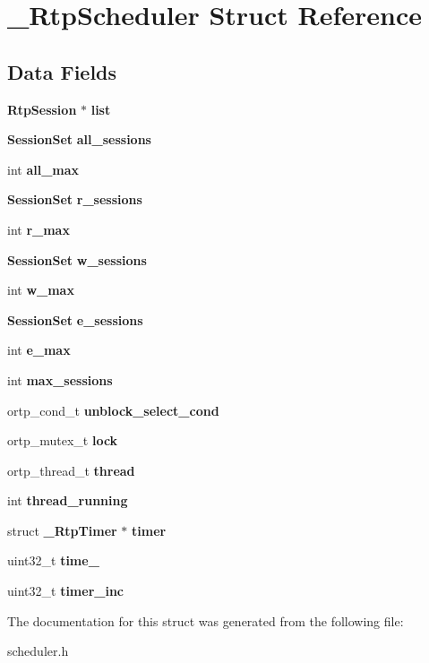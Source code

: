\section{\+\_\+\+Rtp\+Scheduler Struct Reference}
\label{struct__RtpScheduler}
\subsection*{Data Fields}
\begin{DoxyCompactItemize}
\item 
\mbox{\label{struct__RtpScheduler_a00008d3e3c83553fd3379068b9a0969d}} 
\textbf{ Rtp\+Session} $\ast$ {\bfseries list}
\item 
\mbox{\label{struct__RtpScheduler_aebda68a3931ef9bb18dae5c384a8412c}} 
\textbf{ Session\+Set} {\bfseries all\+\_\+sessions}
\item 
\mbox{\label{struct__RtpScheduler_ac52c29bf3a02bdf14af171b31432e23f}} 
int {\bfseries all\+\_\+max}
\item 
\mbox{\label{struct__RtpScheduler_a7faa9121b5e9bad92f507d0916943ec1}} 
\textbf{ Session\+Set} {\bfseries r\+\_\+sessions}
\item 
\mbox{\label{struct__RtpScheduler_a4350a88b7da8885624a7571c1f045a85}} 
int {\bfseries r\+\_\+max}
\item 
\mbox{\label{struct__RtpScheduler_aa23658a59fb05b48e3808b5cc0e7178f}} 
\textbf{ Session\+Set} {\bfseries w\+\_\+sessions}
\item 
\mbox{\label{struct__RtpScheduler_a10ef867c7adf6c112e61c1b4ab2e54aa}} 
int {\bfseries w\+\_\+max}
\item 
\mbox{\label{struct__RtpScheduler_a2b6a53d81f66f5e4792c3335e05f2952}} 
\textbf{ Session\+Set} {\bfseries e\+\_\+sessions}
\item 
\mbox{\label{struct__RtpScheduler_a4602c550364a061bfb00af25dcffc439}} 
int {\bfseries e\+\_\+max}
\item 
\mbox{\label{struct__RtpScheduler_a70cdce21e08b9d496f4c28d0cfd830a4}} 
int {\bfseries max\+\_\+sessions}
\item 
\mbox{\label{struct__RtpScheduler_ae4a6944471f822661d5ce79a3ac48303}} 
ortp\+\_\+cond\+\_\+t {\bfseries unblock\+\_\+select\+\_\+cond}
\item 
\mbox{\label{struct__RtpScheduler_a5f25925b43f90fab9b116ad0e7310916}} 
ortp\+\_\+mutex\+\_\+t {\bfseries lock}
\item 
\mbox{\label{struct__RtpScheduler_a48566a14a40e0da7574f820bc99a6e63}} 
ortp\+\_\+thread\+\_\+t {\bfseries thread}
\item 
\mbox{\label{struct__RtpScheduler_a8e949e051805afd4ed1bd0e8f6e4ebc7}} 
int {\bfseries thread\+\_\+running}
\item 
\mbox{\label{struct__RtpScheduler_a3dfed6377e34164e9d9d965b39d0f207}} 
struct \textbf{ \+\_\+\+Rtp\+Timer} $\ast$ {\bfseries timer}
\item 
\mbox{\label{struct__RtpScheduler_a002be9d6eb8f5093fbaed450d378e170}} 
uint32\+\_\+t {\bfseries time\+\_\+}
\item 
\mbox{\label{struct__RtpScheduler_a8b347fdba521ffc4b0ae5926af1c800c}} 
uint32\+\_\+t {\bfseries timer\+\_\+inc}
\end{DoxyCompactItemize}


The documentation for this struct was generated from the following file\+:\begin{DoxyCompactItemize}
\item 
scheduler.\+h\end{DoxyCompactItemize}
